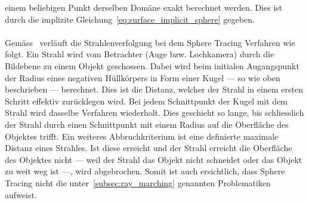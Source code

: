 einem beliebigen Punkt derselben Domäne exakt berechnet werden. Dies ist durch
die implizite Gleichung~\ref{eq:surface_implicit_sphere} gegeben.\\
\\
Gemäss~\cite{hart_ray_1989} verläuft die Strahlenverfolgung bei dem Sphere
Tracing Verfahren wie folgt. Ein Strahl wird vom Betrachter (Auge bzw.
Lochkamera) durch die Bildebene zu einem Objekt geschossen. Dabei wird beim
initialen Augangspunkt der Radius eines negativen Hüllkörpers in Form einer
Kugel --- so wie oben beschrieben --- berechnet. Dies ist die Distanz, welcher
der Strahl in einem ersten Schritt effektiv zurücklegen wird. Bei jedem
Schnittpunkt der Kugel mit dem Strahl wird dasselbe Verfahren wiederholt. Dies
geschieht so lange, bis schliesslich der Strahl durch einen Schnittpunkt mit
einem Radius auf die Oberfläche des Objektes trifft. Ein weiteres
Abbruchkriterium ist eine definierte maximale Distanz eines Strahles. Ist diese
erreicht und der Strahl erreicht die Oberfläche des Objektes nicht --- weil der
Strahl das Objekt nicht schneidet oder das Objekt zu weit weg ist ---, wird
abgebrochen. Somit ist auch ersichtlich, dass Sphere Tracing nicht die
unter~\ref{subsec:ray_marching} genannten Problematiken aufweist.


